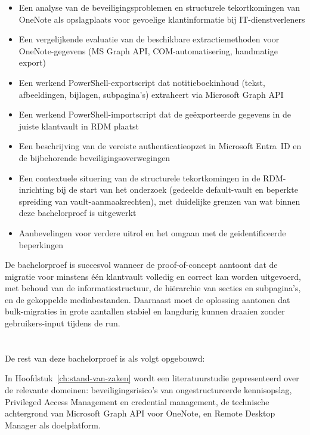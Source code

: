 \begin{itemize}
  \item Een analyse van de beveiligingsproblemen en structurele tekortkomingen van OneNote als opslagplaats voor gevoelige klantinformatie bij IT-dienstverleners
  \item Een vergelijkende evaluatie van de beschikbare extractiemethoden voor OneNote-gegevens (MS Graph API, COM-automatisering, handmatige export)
  \item Een werkend PowerShell-exportscript dat notitieboekinhoud (tekst, afbeeldingen, bijlagen, subpagina's) extraheert via Microsoft Graph API
  \item Een werkend PowerShell-importscript dat de geëxporteerde gegevens in de juiste klantvault in RDM plaatst
  \item Een beschrijving van de vereiste authenticatieopzet in Microsoft Entra~ID en de bijbehorende beveiligingsoverwegingen
  \item Een contextuele situering van de structurele tekortkomingen in de RDM-inrichting bij de start van het onderzoek (gedeelde default-vault en beperkte spreiding van vault-aanmaakrechten), met duidelijke grenzen van wat binnen deze bachelorproef is uitgewerkt
  \item Aanbevelingen voor verdere uitrol en het omgaan met de geïdentificeerde beperkingen
\end{itemize}

De bachelorproef is succesvol wanneer de proof-of-concept aantoont dat de migratie voor minstens één klantvault volledig en correct kan worden uitgevoerd, met behoud van de informatiestructuur, de hiërarchie van secties en subpagina's, en de gekoppelde mediabestanden. Daarnaast moet de oplossing aantonen dat bulk-migraties in grote aantallen stabiel en langdurig kunnen draaien zonder gebruikers-input tijdens de run.

\section{}%
\label{sec:opzet-bachelorproef}

De rest van deze bachelorproef is als volgt opgebouwd:

In Hoofdstuk~\ref{ch:stand-van-zaken} wordt een literatuurstudie gepresenteerd over de relevante domeinen: beveiligingsrisico's van ongestructureerde kennisopslag, Privileged Access Management en credential management, de technische achtergrond van Microsoft Graph API voor OneNote, en Remote Desktop Manager als doelplatform.


